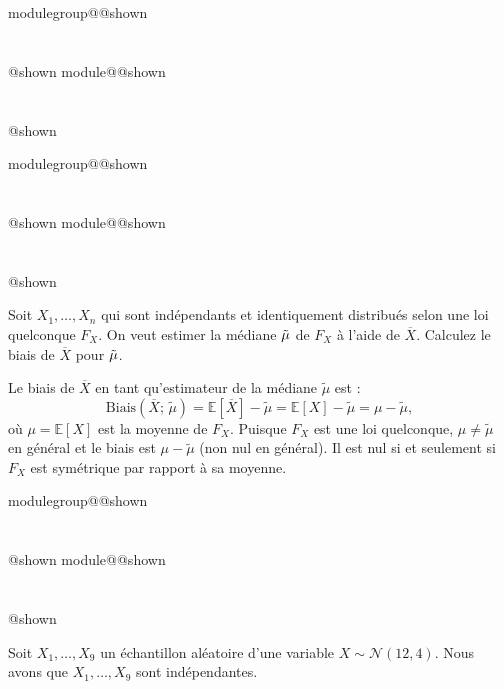\documentclass{Evaluation}
\makeatletter
\newcommand{\currentmodulekey}{}
\newcommand{\currentmoduletitle}{}
\newcommand{\currentgroupkey}{}
\newcommand{\currentgrouptitle}{}
\newcommand{\showmoduleifneeded}{%
  \ifx\currentgroupkey\empty\else
    \expandafter\ifx\csname modulegroup@\currentgroupkey @shown\endcsname\relax
      \section*{\currentgrouptitle}%
      \expandafter\gdef\csname modulegroup@\currentgroupkey @shown\endcsname{1}%
    \fi
  \fi
  \expandafter\ifx\csname module@\currentmodulekey @shown\endcsname\relax
    \section*{\currentmoduletitle}%
    \expandafter\gdef\csname module@\currentmodulekey @shown\endcsname{1}%
  \fi
}
\newenvironment{A23}{\showmoduleifneeded}{}
\newenvironment{H26}{\showmoduleifneeded}{}
\newenvironment{H26r}{\showmoduleifneeded}{}
\makeatother
\begin{document}
\begin{questions}
\begin{H26r}
\begin{parts}
\begin{solution}
        \end{solution}
    \end{parts}
\end{H26r}

\begin{H26}
\question {} %
Soit $X_1,\hdots,X_n$ qui sont indépendants et identiquement distribués selon une loi quelconque $F_X$.
On veut estimer la médiane $\Tilde{\mu}$ de $F_X$ à l'aide de $\overline{X}$.
Calculez le biais de $\overline{X}$ pour $\Tilde{\mu}$.

\begin{solution}
Le biais de $\overline{X}$ en tant qu'estimateur de la médiane $\tilde{\mu}$ est :
$$\text{Biais}(\overline{X};\,\tilde{\mu})=\mathbb{E}[\overline{X}]-\tilde{\mu}=\mathbb{E}[X]-\tilde{\mu}=\mu-\tilde{\mu},$$
o\`u $\mu=\mathbb{E}[X]$ est la moyenne de $F_X$. Puisque $F_X$ est une loi quelconque, $\mu\neq\tilde{\mu}$ en général et le biais est $\mu-\tilde{\mu}$ (non nul en général). Il est nul si et seulement si $F_X$ est symétrique par rapport à sa moyenne.
\end{solution}
\end{H26}

\begin{A23}
\question {} %
Soit $X_1, \hdots, X_9$ un échantillon aléatoire d'une variable $X\sim\mathcal{N}(12, 4)$. Nous avons que $X_1, \dots, X_9$ sont indépendantes.

\end{A23}
\end{questions}
\end{document}
